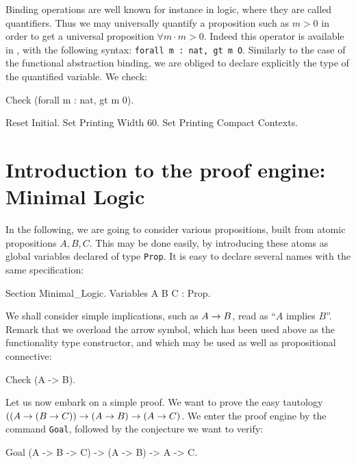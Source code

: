 \documentclass[11pt,a4paper]{book}
\begin{document}
Binding operations are well known for instance in logic, where they
are called quantifiers.  Thus we may universally quantify a
proposition such as $m>0$ in order to get a universal proposition
$\forall m\cdot m>0$. Indeed this operator is available in \Coq, with
the following syntax: \texttt{forall m : nat, gt m O}. Similarly to the
case of the functional abstraction binding, we are obliged to declare
explicitly the type of the quantified variable. We check:
\begin{coq_example}
Check (forall m : nat, gt m 0).
\end{coq_example}

\begin{coq_eval}
Reset Initial.
Set Printing Width 60.
Set Printing Compact Contexts.
\end{coq_eval}

\section{Introduction to the proof engine: Minimal Logic}

In the following, we are going to consider various propositions, built
from atomic propositions $A, B, C$. This may be done easily, by
introducing these atoms as global variables declared of type \verb:Prop:.
It is easy to declare several names with the same specification:
\begin{coq_example}
Section Minimal_Logic.
Variables A B C : Prop.
\end{coq_example}

We shall consider simple implications, such as $A\rightarrow B$, read as 
``$A$ implies $B$''. Remark that we overload the arrow symbol, which
has been used above as the functionality type constructor, and which
may be used as well as propositional connective:
\begin{coq_example}
Check (A -> B).
\end{coq_example}

Let us now embark on a simple proof. We want to prove the easy tautology
$((A\rightarrow (B\rightarrow C))\rightarrow (A\rightarrow B)\rightarrow (A\rightarrow C)$. 
We enter the proof engine by the command
\verb:Goal:, followed by the conjecture we want to verify:
\begin{coq_example}
Goal (A -> B -> C) -> (A -> B) -> A -> C.
\end{coq_example}
\end{document}
